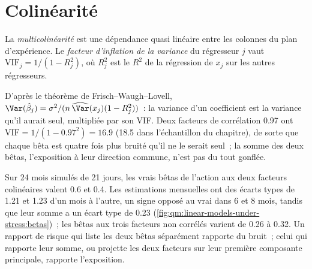 \section{Colinéarité}

\begin{definition}\label{def:qm:linear-models-under-stress:vif}
La \emph{multicolinéarité} est une dépendance quasi linéaire entre les colonnes du plan d'expérience. Le \emph{facteur
d'inflation de la variance} du régresseur $j$ vaut $\mathrm{VIF}_j = 1/(1 - R_j^2)$, où $R_j^2$ est le $R^2$ de la régression de $x_j$ sur les
autres régresseurs.
\end{definition}

D'après le théorème de Frisch--Waugh--Lovell, $\Var(\hat\beta_j) = \sigma^2/(n\,\widehat{\Var}(x_j)(1 - R_j^2))$~: la variance d'un coefficient
est la variance qu'il aurait seul, multipliée par son VIF. Deux facteurs de corrélation 0.97 ont $\mathrm{VIF} = 1/(1 - 0.97^2) = 16.9$ (18.5 dans
l'échantillon du chapitre), de sorte que chaque bêta est quatre fois plus bruité qu'il ne le serait seul~; la somme des deux bêtas, l'exposition
à leur direction commune, n'est pas du tout gonflée.

Sur 24 mois simulés de 21 jours, les vrais bêtas de l'action aux deux facteurs colinéaires valent 0.6 et 0.4. Les estimations mensuelles ont
des écarts types de 1.21 et 1.23 d'un mois à l'autre, un signe opposé au vrai dans 6 et 8 mois, tandis que leur somme a un écart type de 0.23
(\cref{fig:qm:linear-models-under-stress:betas})~; les bêtas aux trois facteurs non corrélés varient de 0.26 à 0.32. Un rapport de risque qui
liste les deux bêtas séparément rapporte du bruit~; celui qui rapporte leur somme, ou projette les deux facteurs sur leur première composante principale,
rapporte l'exposition.

